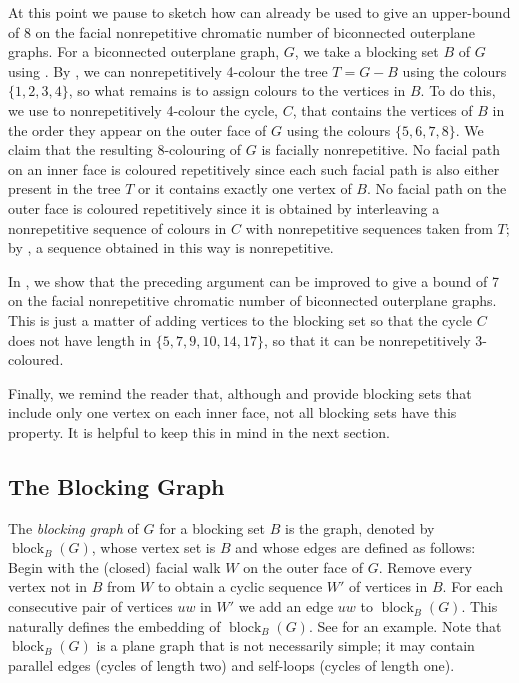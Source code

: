 \documentclass{patmorin}
\DeclareMathOperator{\block}{block}
\begin{document}
At this point we pause to sketch how 
can already be used to give an upper-bound of 8 on the facial
nonrepetitive chromatic number of biconnected outerplane graphs.  For a
biconnected outerplane graph, $G$, we take a blocking set $B$ of $G$
using .  By , we can nonrepetitively
4-colour the tree $T=G-B$ using the colours $\{1,2,3,4\}$, so
what remains is to assign colours to the vertices in $B$.  To do this,
we use  to nonrepetitively 4-colour the cycle, $C$, that
contains the vertices of $B$ in the order they appear on the outer face
of $G$ using the colours $\{5,6,7,8\}$.  We claim that the resulting
8-colouring of $G$ is facially nonrepetitive.  No facial path on an
inner face is coloured repetitively since each such facial path is also
either present in the tree $T$ or it contains exactly one vertex of $B$.
No facial path on the outer face is coloured repetitively since it is
obtained by interleaving a nonrepetitive sequence of colours in $C$
with nonrepetitive sequences taken from $T$; by ,
a sequence obtained in this way is nonrepetitive.

In , we show that the preceding argument can be
improved to give a bound of 7 on the facial nonrepetitive chromatic
number of biconnected outerplane graphs. This is just a matter of adding
vertices to the blocking set so that the cycle $C$ does not have length
in $\{5,7,9,10,14,17\}$, so that it can be nonrepetitively 3-coloured.

Finally, we remind the reader that, although  and
 provide blocking sets that include only one
vertex on each inner face, not all blocking sets have this property.
It is helpful to keep this in mind in the next section.

\subsection{The Blocking Graph}


The \emph{blocking graph} of $G$ for a blocking set $B$ is the graph,
denoted by $\block_B(G)$, whose vertex set is $B$ and whose edges are
defined as follows: Begin with the (closed) facial walk $W$ on the outer
face of $G$. Remove every vertex not in $B$ from $W$ to obtain a cyclic
sequence $W'$ of vertices in $B$. For each consecutive pair of vertices
$uw$ in $W'$ we add an edge $uw$ to $\block_B(G)$.  This naturally
defines the embedding of $\block_B(G)$. See 
for an example.   Note that $\block_B(G)$ is a plane graph that is not
necessarily simple; it may contain parallel edges (cycles of length
two) and self-loops (cycles of length one).
\end{document}
